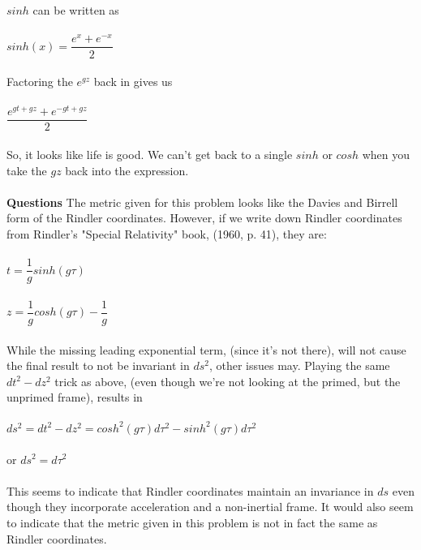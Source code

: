 \documentclass[prb,preprint]
{revtex4-1}
\newcommand{\PRLsep}{\noindent\makebox[\linewidth]{\resizebox{0.8888\linewidth}{2pt}{$\bullet$}}\bigskip}
\begin{document}
\\
\\
$sinh$ can be written as 
\\
\\
$sinh\left(x\right) = \dfrac{e^x +e^{-x}}{2}$
\\
\\
Factoring the $e^{gz}$ back in gives us
\\
\\
$\dfrac{e^{gt + gz} +e^{-gt + gz}}{2}$
\\
\\
So, it looks like life is good.  We can't get back to a single $sinh$ or $cosh$ when you take the $gz$ back into the expression.
\\
\\
\textbf{Questions}
The metric given for this problem looks like the Davies and Birrell form of the Rindler coordinates.  However, if we write down Rindler coordinates from Rindler's "Special Relativity" book, (1960, p. 41), they are:
\\
\\
$t = \dfrac{1}{g}sinh\left(g \tau\right)$
\\
\\
$z = \dfrac{1}{g}cosh\left(g \tau\right) - \dfrac{1}{g}$
\\
\\
While the missing leading exponential term, (since it's not there), will not cause the final result to not be invariant in $ds^2$, other issues may.  Playing the same $dt^2 - dz^2$ trick as above, (even though we're not looking at the primed, but the unprimed frame), results in 
\\
\\
$ds^2 = dt^2 - dz^2 = cosh^2\left(g\tau\right)d\tau^2 - sinh^2\left(g\tau\right)d\tau^2$
\\
\\
or $ds^2 = d\tau^2$
\\
\\
This seems to indicate that Rindler coordinates maintain an invariance in $ds$ even though they incorporate acceleration and a non-inertial frame.  It would also seem to indicate that the metric given in this problem is not in fact the same as Rindler coordinates.
\\
\\
\PRLsep


\end{document}
